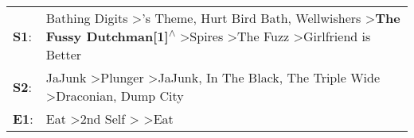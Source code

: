 \begin{supertabular}{p{0.03\textwidth}p{0.92\textwidth}}
 \textbf{S1}:  &  Bathing Digits\textsuperscript{} \textgreater {}'s Theme\textsuperscript{}, \enspace Hurt Bird Bath\textsuperscript{}, \enspace Wellwishers\textsuperscript{} \textgreater \enspace \textbf{The Fussy Dutchman[1]\textsuperscript{$\wedge$}} \textgreater \enspace Spires\textsuperscript{} \textgreater \enspace The Fuzz\textsuperscript{} \textgreater \enspace Girlfriend is Better\textsuperscript{}  \enspace  \\
 \textbf{S2}:  &                                                                                                                JaJunk\textsuperscript{} \textgreater \enspace Plunger\textsuperscript{} \textgreater \enspace JaJunk\textsuperscript{}, \enspace In The Black\textsuperscript{}, \enspace The Triple Wide\textsuperscript{} \textgreater \enspace Draconian\textsuperscript{}, \enspace Dump City\textsuperscript{}  \enspace  \\
 \textbf{E1}:  &                                                                                                                                                                                                                                                      Eat\textsuperscript{} \textgreater \enspace 2nd Self\textsuperscript{} \textgreater {}\textsuperscript{} \textgreater \enspace Eat\textsuperscript{}  \enspace  \\
\end{supertabular}
